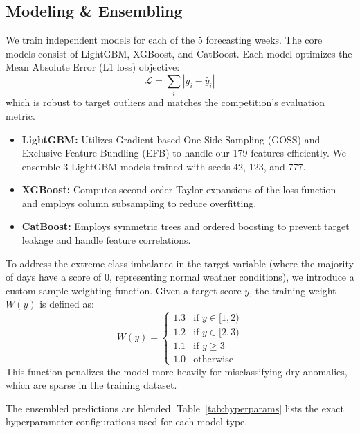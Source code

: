 \documentclass[conference]{IEEEtran}
\begin{document}
\subsection{Modeling \& Ensembling}
We train independent models for each of the 5 forecasting weeks. The core models consist of LightGBM, XGBoost, and CatBoost. Each model optimizes the Mean Absolute Error (L1 loss) objective:
\begin{equation}
    \mathcal{L} = \sum_{i} |y_i - \hat{y}_i|
\end{equation}
which is robust to target outliers and matches the competition's evaluation metric. 

\begin{itemize}
    \item \textbf{LightGBM:} Utilizes Gradient-based One-Side Sampling (GOSS) and Exclusive Feature Bundling (EFB) to handle our 179 features efficiently. We ensemble 3 LightGBM models trained with seeds 42, 123, and 777.
    \item \textbf{XGBoost:} Computes second-order Taylor expansions of the loss function and employs column subsampling to reduce overfitting.
    \item \textbf{CatBoost:} Employs symmetric trees and ordered boosting to prevent target leakage and handle feature correlations.
\end{itemize}

To address the extreme class imbalance in the target variable (where the majority of days have a score of 0, representing normal weather conditions), we introduce a custom sample weighting function. Given a target score $y$, the training weight $W(y)$ is defined as:
\begin{equation}
W(y) = \begin{cases} 
1.3 & \text{if } y \in [1, 2) \\ 
1.2 & \text{if } y \in [2, 3) \\ 
1.1 & \text{if } y \ge 3 \\ 
1.0 & \text{otherwise} 
\end{cases}
\end{equation}
This function penalizes the model more heavily for misclassifying dry anomalies, which are sparse in the training dataset.

The ensembled predictions are blended. Table~\ref{tab:hyperparams} lists the exact hyperparameter configurations used for each model type.
\end{document}

